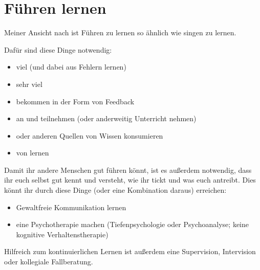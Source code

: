 \section{Führen lernen}
\label{fuehren-lernen}
\label{fuehrung-lernen}

Meiner Ansicht nach ist Führen zu lernen so ähnlich wie singen zu lernen.

Dafür sind diese Dinge notwendig:

\begin{itemize}
  \item viel  (und dabei aus Fehlern lernen)
  \item sehr viel  
  \item {} bekommen in der Form von Feedback  
  \item an  und  teilnehmen (oder anderweitig Unterricht nehmen)
  \item {} oder anderen Quellen von Wissen konsumieren
  \item von  lernen
\end{itemize}

Damit ihr andere Menschen gut führen könnt, ist es außerdem notwendig, dass ihr euch selbst gut kennt und versteht, wie ihr tickt und was euch antreibt. Dies könnt ihr durch diese Dinge (oder eine Kombination daraus) erreichen:

\begin{itemize}
  \item Gewaltfreie Kommunikation lernen 
  \item eine Psychotherapie machen (Tiefenpsychologie oder Psychoanalyse; keine kognitive Verhaltenstherapie)  
\end{itemize}

Hilfreich zum kontinuierlichen Lernen ist außerdem eine Supervision, Intervision oder kollegiale Fallberatung.
